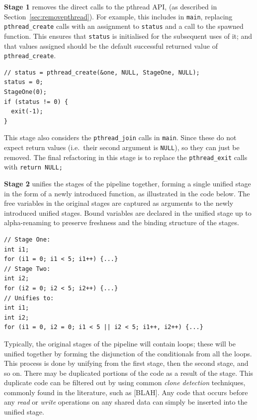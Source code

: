 \textbf{Stage 1} removes the direct calls to the pthread API, (as described in Section~\ref{sec:removepthread}). For example, this includes in \lstinline|main|, replacing \lstinline|pthread_create| calls with an assignment to \lstinline|status| and a call to the spawned function. This ensures that \lstinline|status| is initialised for the subsequent uses of it; and that values assigned should be the default successful returned value of \lstinline|pthread_create|.
\begin{lstlisting}[frame=single]
// status = pthread_create(&one, NULL, StageOne, NULL);
status = 0;
StageOne(0);
if (status != 0) {
  exit(-1);
}
\end{lstlisting}
\noindent
This stage also considers the \lstinline|pthread_join| calls in \lstinline|main|. Since these do not expect return values (i.e.\ their second argument is \lstinline|NULL|), so they can just be removed.
The final refactoring in this stage is to replace the \lstinline|pthread_exit| calls with \lstinline|return NULL;|

\textbf{Stage 2} unifies the stages of the pipeline together, forming a single unified stage in the form of a newly introduced function, as illustrated in the code below. The free variables in the original stages are captured as arguments to the newly introduced unified stages. Bound variables are declared in the unified stage up to alpha-renaming to preserve freshness and the binding structure of the stages. 

  \begin{lstlisting}[frame=single]
// Stage One:
int i1;
for (i1 = 0; i1 < 5; i1++) {...}
// Stage Two:
int i2;
for (i2 = 0; i2 < 5; i2++) {...}
// Unifies to:
int i1;
int i2;
for (i1 = 0, i2 = 0; i1 < 5 || i2 < 5; i1++, i2++) {...}
\end{lstlisting}
\noindent
Typically, the original stages of the pipeline will contain loops; these will be unified together by forming the disjunction of the conditionals from all the loops.
 This process is done by unifying from the first stage, then the second stage, and so on. There may be duplicated portions of the code as a result of the stage. This duplicate code can be filtered out by using common \emph{clone detection} techniques, commonly found in the literature, such as [BLAH]. Any code that occurs before any \emph{read} or \emph{write} operations on any shared data can simply be inserted into the unified stage. 
 
